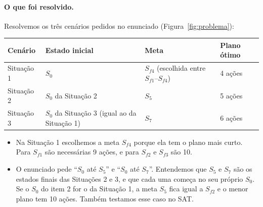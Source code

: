\documentclass[11pt,a4paper]{article}
\begin{document}
\paragraph{O que foi resolvido.} Resolvemos os três cenários pedidos no enunciado
(Figura~\ref{fig:problema}):
\begin{center}\small
\begin{tabular}{@{}llll@{}}
\toprule
Cenário & Estado inicial & Meta & Plano ótimo\\
\midrule
Situação 1 & $S_0$ & $S_{f4}$ (escolhida entre $S_{f1}$--$S_{f4}$) & 4 ações\\
Situação 2 & $S_0$ da Situação 2 & $S_5$ & 5 ações\\
Situação 3 & $S_0$ da Situação 3 (igual ao da Situação 1) & $S_7$ & 6 ações\\
\bottomrule
\end{tabular}
\end{center}
\begin{itemize}
  \item Na Situação 1 escolhemos a meta $S_{f4}$ porque ela tem o plano mais
        curto. Para $S_{f1}$ são necessárias 9 ações, e para $S_{f2}$ e $S_{f3}$
        são 10.
  \item O enunciado pede ``$S_0$ até $S_5$'' e ``$S_0$ até $S_7$''. Entendemos que
        $S_5$ e $S_7$ são os estados finais das Situações 2 e 3, e que cada uma
        começa no seu próprio $S_0$. Se o $S_0$ do item 2 for o da Situação 1, a
        meta $S_5$ fica igual a $S_{f2}$ e o menor plano tem 10 ações. Também
        testamos esse caso no SAT.
\end{itemize}
\end{document}
